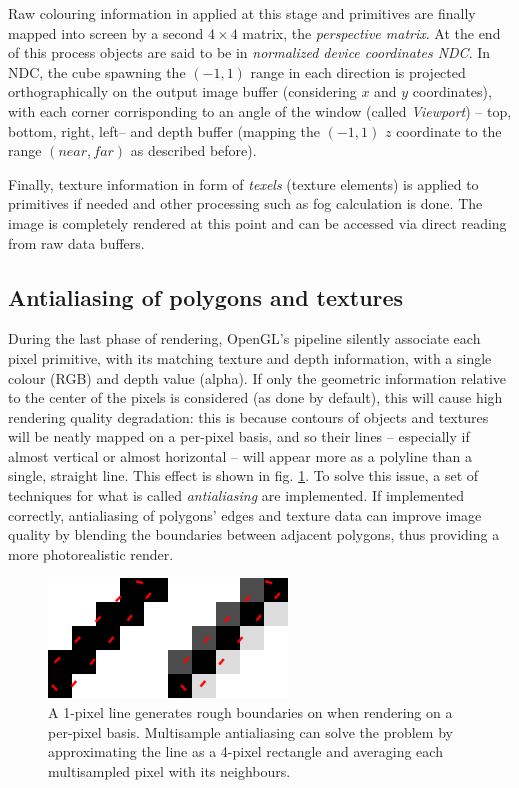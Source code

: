 Raw colouring information in applied at this stage and primitives are finally
mapped into screen by a second $4\times 4$ matrix, the \emph{perspective
matrix}. At the end of this process objects are said to be in \emph{normalized
device coordinates \emph{NDC}}. In NDC, the cube spawning the
$\left(-1,1\right)$ range in each direction is projected orthographically on the
output image buffer (considering $x$ and $y$ coordinates), with each corner
corrisponding to an angle of the window (called \emph{Viewport}) -- top, bottom,
right, left-- and depth buffer
(mapping the $(-1,1)$ $z$ coordinate to the range $\left( near , far \right)$ as described
before).

Finally, texture information in form of \emph{texels} (texture elements) is applied to primitives if needed and other
processing such as fog calculation is done. The image is completely rendered at
this point and can be accessed via direct reading from raw data buffers.

\subsection{Antialiasing of polygons and textures} \label{sec:antialiasing}
\label{sec:FBO}
During the last phase of rendering, OpenGL's pipeline silently associate each
pixel primitive, with its matching texture and depth information, with a single
colour (RGB) and depth value (alpha). If only the geometric information relative
to the center of the pixels is considered (as done by default), this will cause
high rendering quality degradation: this is because contours of objects and
textures will be neatly mapped on a per-pixel basis, and so their lines --
especially if almost vertical or almost horizontal -- will appear more as a
polyline than a single, straight line. This effect is shown in fig.
\ref{fig:polyline}. To solve this issue, a set of techniques for what is called
\emph{antialiasing} are implemented. If implemented correctly, antialiasing of
polygons' edges and texture data can improve image quality by blending the
boundaries between adjacent polygons, thus providing a more photorealistic
render.

\begin{figure}[htbp] \label{fig:polyline}
  \centering
  \includegraphics[width=2.5in]{./Graphics/antialiasing}
  \caption{A 1-pixel line generates rough boundaries on when rendering on a
  per-pixel basis. Multisample antialiasing can solve the problem by
approximating the line as a 4-pixel rectangle and averaging each multisampled
pixel with its neighbours.}
\end{figure}

